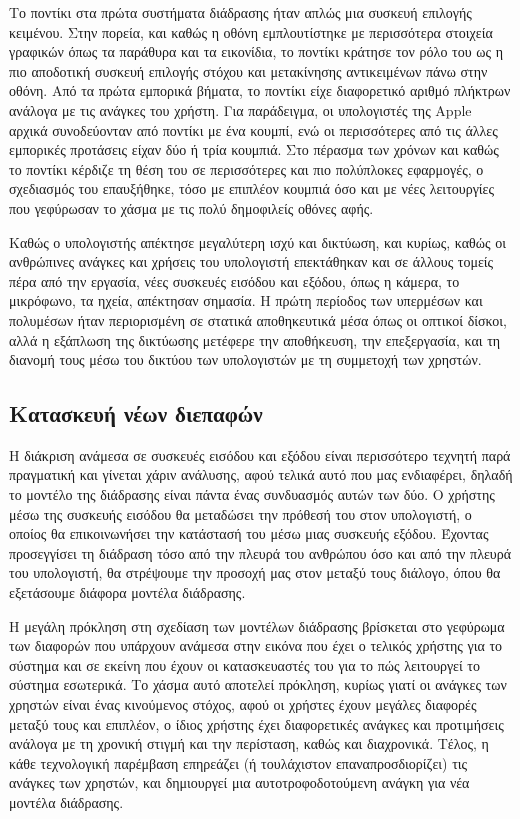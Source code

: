 \documentclass[
]{article}
\begin{document}
Το ποντίκι στα πρώτα συστήματα διάδρασης ήταν απλώς μια συσκευή επιλογής
κειμένου. Στην πορεία, και καθώς η οθόνη εμπλουτίστηκε με περισσότερα
στοιχεία γραφικών όπως τα παράθυρα και τα εικονίδια, το ποντίκι κράτησε
τον ρόλο του ως η πιο αποδοτική συσκευή επιλογής στόχου και μετακίνησης
αντικειμένων πάνω στην οθόνη. Από τα πρώτα εμπορικά βήματα, το ποντίκι
είχε διαφορετικό αριθμό πλήκτρων ανάλογα με τις ανάγκες του χρήστη. Για
παράδειγμα, οι υπολογιστές της Apple αρχικά συνοδεύονταν από ποντίκι με
ένα κουμπί, ενώ οι περισσότερες από τις άλλες εμπορικές προτάσεις είχαν
δύο ή τρία κουμπιά. Στο πέρασμα των χρόνων και καθώς το ποντίκι κέρδιζε
τη θέση του σε περισσότερες και πιο πολύπλοκες εφαρμογές, ο σχεδιασμός
του επαυξήθηκε, τόσο με επιπλέον κουμπιά όσο και με νέες λειτουργίες που
γεφύρωσαν το χάσμα με τις πολύ δημοφιλείς οθόνες αφής.

Καθώς ο υπολογιστής απέκτησε μεγαλύτερη ισχύ και δικτύωση, και κυρίως,
καθώς οι ανθρώπινες ανάγκες και χρήσεις του υπολογιστή επεκτάθηκαν και
σε άλλους τομείς πέρα από την εργασία, νέες συσκευές εισόδου και εξόδου,
όπως η κάμερα, το μικρόφωνο, τα ηχεία, απέκτησαν σημασία. Η πρώτη
περίοδος των υπερμέσων και πολυμέσων ήταν περιορισμένη σε στατικά
αποθηκευτικά μέσα όπως οι οπτικοί δίσκοι, αλλά η εξάπλωση της δικτύωσης
μετέφερε την αποθήκευση, την επεξεργασία, και τη διανομή τους μέσω του
δικτύου των υπολογιστών με τη συμμετοχή των χρηστών.

\hypertarget{ux3baux3b1ux3c4ux3b1ux3c3ux3baux3b5ux3c5ux3ae-ux3bdux3adux3c9ux3bd-ux3b4ux3b9ux3b5ux3c0ux3b1ux3c6ux3ceux3bd}{%
\subsection{Κατασκευή νέων
διεπαφών}\label{ux3baux3b1ux3c4ux3b1ux3c3ux3baux3b5ux3c5ux3ae-ux3bdux3adux3c9ux3bd-ux3b4ux3b9ux3b5ux3c0ux3b1ux3c6ux3ceux3bd}}

Η διάκριση ανάμεσα σε συσκευές εισόδου και εξόδου είναι περισσότερο
τεχνητή παρά πραγματική και γίνεται χάριν ανάλυσης, αφού τελικά αυτό που
μας ενδιαφέρει, δηλαδή το μοντέλο της διάδρασης είναι πάντα ένας
συνδυασμός αυτών των δύο. Ο χρήστης μέσω της συσκευής εισόδου θα
μεταδώσει την πρόθεσή του στον υπολογιστή, ο οποίος θα επικοινωνήσει την
κατάστασή του μέσω μιας συσκευής εξόδου. Έχοντας προσεγγίσει τη διάδραση
τόσο από την πλευρά του ανθρώπου όσο και από την πλευρά του υπολογιστή,
θα στρέψουμε την προσοχή μας στον μεταξύ τους διάλογο, όπου θα
εξετάσουμε διάφορα μοντέλα διάδρασης.

Η μεγάλη πρόκληση στη σχεδίαση των μοντέλων διάδρασης βρίσκεται στο
γεφύρωμα των διαφορών που υπάρχουν ανάμεσα στην εικόνα που έχει ο
τελικός χρήστης για το σύστημα και σε εκείνη που έχουν οι κατασκευαστές
του για το πώς λειτουργεί το σύστημα εσωτερικά. Το χάσμα αυτό αποτελεί
πρόκληση, κυρίως γιατί οι ανάγκες των χρηστών είναι ένας κινούμενος
στόχος, αφού οι χρήστες έχουν μεγάλες διαφορές μεταξύ τους και επιπλέον,
ο ίδιος χρήστης έχει διαφορετικές ανάγκες και προτιμήσεις ανάλογα με τη
χρονική στιγμή και την περίσταση, καθώς και διαχρονικά. Τέλος, η κάθε
τεχνολογική παρέμβαση επηρεάζει (ή τουλάχιστον επαναπροσδιορίζει) τις
ανάγκες των χρηστών, και δημιουργεί μια αυτοτροφοδοτούμενη ανάγκη για
νέα μοντέλα διάδρασης.
\end{document}

